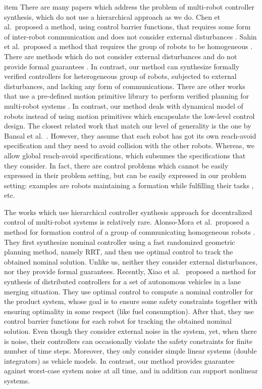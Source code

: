item There are many papers which address the problem of multi-robot controller synthesis, which do not use a hierarchical approach as we do.
Chen et al.\ proposed a method, using control barrier functions, that requires some form of inter-robot communication and does not consider external disturbances \cite{Chen2018cbf}.
Sahin et al.\ proposed a method that requires the group of robots to be homogeneous \cite{Shahin2017cltl}.
There are methods which do not consider external disturbances and do not provide formal guarantees \cite{jackson2020scalable}.
In contrast, our method can synthesize formally verified controllers for heterogeneous group of robots, subjected to external disturbances, and lacking any form of communications. There are other works that use a pre-defined motion primitive library to perform verified planning for multi-robot systems \cite{saha2016implan,BanusicMPSZ19pgcd}. In contrast, our method deals with dynamical model of robots instead of using motion primitives which encapsulate the low-level control design. %
The closest related work that match our level of generality is the one by Bansal et al.\ \cite{bansal2017safe}.
However, they assume that each robot has got its own reach-avoid specification and they need to avoid collision with the other robots.
Whereas, we allow global reach-avoid specifications, which subsumes the specifications that they consider.
In fact, there are control problems which cannot be easily expressed in their problem setting, but can be easily expressed in our problem setting: 
examples are robots maintaining a formation while fulfilling their tasks \cite{alonso2019distributed}, etc.

The works which use hierarchical controller synthesis approach for decentralized control of multi-robot systems is relatively rare.
Alonso-Mora et al.\ proposed a method for formation control of a group of communicating homogeneous robots \cite{alonso2019distributed}.
They first synthesize nominal controller using a fast randomized geometric planning method, namely RRT, and then use optimal control to track the obtained nominal solution.
Unlike us, neither they consider external disturbances, nor they provide formal guarantees.
Recently, Xiao et al.\ \cite{xiao2019merging} proposed a method for synthesis of distributed controllers for a set of autonomous vehicles in a lane merging situation.
They use optimal control to compute a nominal controller for the product system, whose goal is to ensure some safety constraints together with ensuring optimality in some respect (like fuel consumption).
After that, they use control barrier functions for each robot for tracking the obtained nominal solution.
Even though they consider external noise in the system, yet, when there is noise, their controllers can occasionally violate the safety constraints for finite number of time steps.
Moreover, they only consider simple linear systems (double integrators) as vehicle models.
In contrast, our method provides guarantee against worst-case system noise at all time, and in addition can support nonlinear systems. 
 

